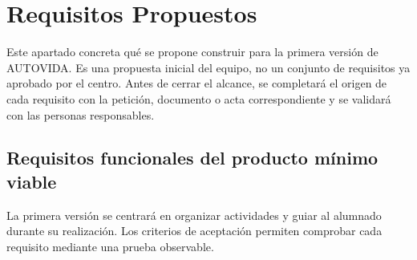 \newpage
\section{Requisitos Propuestos}

Este apartado concreta qué se propone construir para la primera versión de AUTOVIDA. Es una propuesta inicial del equipo, no un conjunto de requisitos ya aprobado por el centro. Antes de cerrar el alcance, se completará el origen de cada requisito con la petición, documento o acta correspondiente y se validará con las personas responsables.

\subsection{Requisitos funcionales del producto mínimo viable}
La primera versión se centrará en organizar actividades y guiar al alumnado durante su realización. Los criterios de aceptación permiten comprobar cada requisito mediante una prueba observable.

